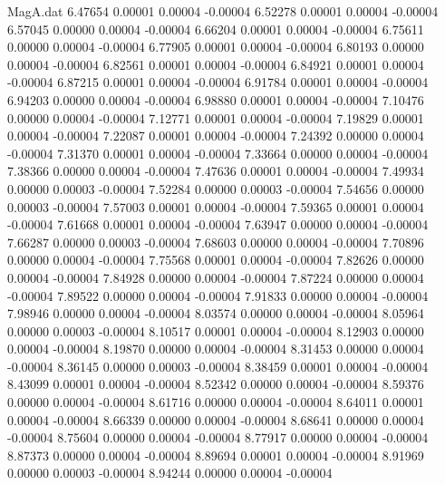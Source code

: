 \begin{filecontents}{MagA.dat}
   6.47654    0.00001    0.00004   -0.00004
   6.52278    0.00001    0.00004   -0.00004
   6.57045    0.00000    0.00004   -0.00004
   6.66204    0.00001    0.00004   -0.00004
   6.75611    0.00000    0.00004   -0.00004
   6.77905    0.00001    0.00004   -0.00004
   6.80193    0.00000    0.00004   -0.00004
   6.82561    0.00001    0.00004   -0.00004
   6.84921    0.00001    0.00004   -0.00004
   6.87215    0.00001    0.00004   -0.00004
   6.91784    0.00001    0.00004   -0.00004
   6.94203    0.00000    0.00004   -0.00004
   6.98880    0.00001    0.00004   -0.00004
   7.10476    0.00000    0.00004   -0.00004
   7.12771    0.00001    0.00004   -0.00004
   7.19829    0.00001    0.00004   -0.00004
   7.22087    0.00001    0.00004   -0.00004
   7.24392    0.00000    0.00004   -0.00004
   7.31370    0.00001    0.00004   -0.00004
   7.33664    0.00000    0.00004   -0.00004
   7.38366    0.00000    0.00004   -0.00004
   7.47636    0.00001    0.00004   -0.00004
   7.49934    0.00000    0.00003   -0.00004
   7.52284    0.00000    0.00003   -0.00004
   7.54656    0.00000    0.00003   -0.00004
   7.57003    0.00001    0.00004   -0.00004
   7.59365    0.00001    0.00004   -0.00004
   7.61668    0.00001    0.00004   -0.00004
   7.63947    0.00000    0.00004   -0.00004
   7.66287    0.00000    0.00003   -0.00004
   7.68603    0.00000    0.00004   -0.00004
   7.70896    0.00000    0.00004   -0.00004
   7.75568    0.00001    0.00004   -0.00004
   7.82626    0.00000    0.00004   -0.00004
   7.84928    0.00000    0.00004   -0.00004
   7.87224    0.00000    0.00004   -0.00004
   7.89522    0.00000    0.00004   -0.00004
   7.91833    0.00000    0.00004   -0.00004
   7.98946    0.00000    0.00004   -0.00004
   8.03574    0.00000    0.00004   -0.00004
   8.05964    0.00000    0.00003   -0.00004
   8.10517    0.00001    0.00004   -0.00004
   8.12903    0.00000    0.00004   -0.00004
   8.19870    0.00000    0.00004   -0.00004
   8.31453    0.00000    0.00004   -0.00004
   8.36145    0.00000    0.00003   -0.00004
   8.38459    0.00001    0.00004   -0.00004
   8.43099    0.00001    0.00004   -0.00004
   8.52342    0.00000    0.00004   -0.00004
   8.59376    0.00000    0.00004   -0.00004
   8.61716    0.00000    0.00004   -0.00004
   8.64011    0.00001    0.00004   -0.00004
   8.66339    0.00000    0.00004   -0.00004
   8.68641    0.00000    0.00004   -0.00004
   8.75604    0.00000    0.00004   -0.00004
   8.77917    0.00000    0.00004   -0.00004
   8.87373    0.00000    0.00004   -0.00004
   8.89694    0.00001    0.00004   -0.00004
   8.91969    0.00000    0.00003   -0.00004
   8.94244    0.00000    0.00004   -0.00004

\end{filecontents}
